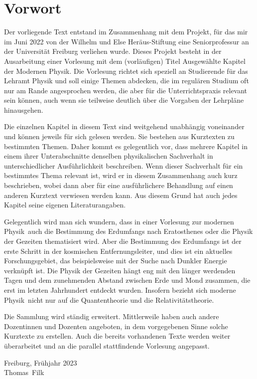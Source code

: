 
\chapter*{Vorwort}
\thispagestyle{empty}

Der vorliegende Text entstand im Zusammenhang 
mit dem Projekt, f\"ur das mir im Juni 2022 von der Wilhelm und Else Her\"aus-Stiftung
eine Seniorprofessur an der Universit\"at Freiburg verliehen wurde. Dieses Projekt
besteht in der Ausarbeitung einer Vorlesung mit dem (vorl\"aufigen) Titel
\glqq Ausgew\"ahlte Kapitel der Modernen Physik\grqq. Die Vorlesung richtet sich
speziell an Studierende  f\"ur das Lehramt Physik und soll einige Themen abdecken,
die im regul\"aren Studium oft nur am Rande angesprochen werden, die aber f\"ur
die Unterrichtspraxis relevant sein k\"onnen, auch wenn sie teilweise deutlich \"uber
die Vorgaben der Lehrpl\"ane hinausgehen.  

Die einzelnen Kapitel in diesem Text sind weitgehend unabh\"angig voneinander und
k\"onnen jeweils f\"ur sich gelesen werden. Sie bestehen aus Kurztexten zu bestimmten
Themen. Daher kommt es gelegentlich vor, dass mehrere Kapitel in einem ihrer Unterabschnitte
denselben physikalischen Sachverhalt in unterschiedlicher Ausf\"uhrlichkeit beschreiben.
Wenn dieser Sachverhalt f\"ur ein bestimmtes Thema relevant ist, wird er in diesem
Zusammenhang auch kurz beschrieben, wobei dann aber f\"ur eine ausf\"uhrlichere
Behandlung auf einen anderen Kurztext verwiesen werden kann. Aus diesem Grund hat
auch jedes Kapitel seine eigenen Literaturangaben. 

Gelegentlich wird man sich wundern, dass in einer Vorlesung zur \glqq modernen Physik\grqq\
auch die Bestimmung des Erdumfangs nach Eratosthenes oder die Physik der
Gezeiten thematisiert wird. Aber die Bestimmung des Erdumfangs ist der erste Schritt in
der kosmischen Entfernungsleiter, und dies ist ein aktuelles Forschungsgebiet, das
beispielsweise mit der Suche nach Dunkler Energie verkn\"upft ist. Die Physik der
Gezeiten h\"angt eng mit den l\"anger werdenden Tagen und dem zunehmenden Abstand
zwischen Erde und Mond zusammen, die erst im letzten Jahrhundert entdeckt wurden. 
Insofern bezieht sich \glqq moderne Physik\grqq\ nicht nur auf die Quantentheorie und die
Relativit\"atstheorie. 

Die Sammlung wird st\"andig erweitert. Mittlerweile haben auch andere Dozentinnen und
Dozenten angeboten, in dem vorgegebenen Sinne solche Kurztexte zu erstellen. Auch die bereits
vorhandenen Texte werden weiter \"uberarbeitet und an die parallel stattfindende
Vorlesung angepasst. 

\vspace{0.3cm}

\noindent
Freiburg, Fr\"uhjahr 2023\\
Thomas~Filk
%
